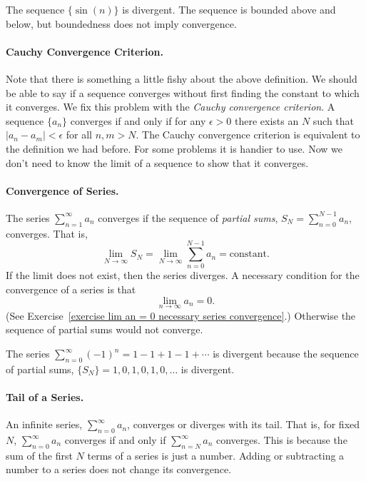 \begin{Example}
  The sequence $\{ \sin(n) \}$ is divergent.  The sequence 
  is bounded above and below, but boundedness does not imply convergence.
\end{Example}




\paragraph{Cauchy Convergence Criterion.}
Note that there is something a little fishy about the above definition.
We should be able to say if a sequence converges without first finding the 
constant to which it converges.  We fix this problem with the
\textit{Cauchy convergence criterion}.
A sequence $\{a_n\}$ converges if and only if for any $\epsilon > 0$ there 
exists an $N$ such that $|a_n - a_m| < \epsilon$ for all $n,m > N$.  The Cauchy 
convergence criterion is equivalent to the definition we had before.
For some problems it is handier to use.  Now we don't need to know 
the limit of a sequence to show that it converges.



\paragraph{Convergence of Series.}
The series $\sum_{n = 1}^\infty a_n$ converges if the sequence of \textit{partial sums}, 
$S_N = \sum_{n=0}^{N-1} a_n$,
converges.  That is,
\[ 
\lim_{N \to \infty} S_N = 
\lim_{N \to \infty} \sum_{n=0}^{N-1} a_n = \mathrm{constant}.
\]
If the limit does not exist, then the series diverges.
A necessary condition for the convergence of a series is that
\[ 
\lim_{n \to \infty} a_n = 0.
\]
(See Exercise~\ref{exercise lim an = 0 necessary series convergence}.)
Otherwise the sequence of partial sums would not converge.




\begin{Example}
  The series $\sum_{n = 0}^\infty (-1)^n = 1 - 1 + 1 - 1 + \cdots$ is divergent because 
  the sequence of partial sums, $\{ S_N \} = 1, 0, 1, 0, 1, 0, \ldots$ 
  is divergent.
\end{Example}




\paragraph{Tail of a Series.}
An infinite series, $\sum_{n=0}^\infty a_n$, converges or diverges with its tail.
That is, for fixed $N$,  $\sum_{n=0}^\infty a_n$ converges if and only if 
$\sum_{n=N}^\infty a_n$ converges.  This is because the sum of the first 
$N$ terms of a series is just a number.  Adding or subtracting a number to 
a series does not change its convergence.





